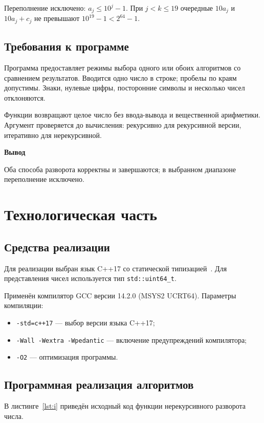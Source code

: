 \documentclass[14pt,a4paper]{extarticle}
\newcommand{\conclusion}[1]{\par\medskip\noindent\begin{minipage}{\linewidth}\setlength{\parindent}{1.25cm}\noindent\hspace*{\parindent}\textbf{Вывод}\par\indent #1\par\end{minipage}\par}
\numberwithin{equation}{section}
\numberwithin{figure}{section}
\numberwithin{table}{section}
\begin{document}
Переполнение исключено: $a_j\le10^j-1$. При $j<k\le19$ очередные $10a_j$ и $10a_j+c_j$ не превышают $10^{19}-1<2^{64}-1$.

\subsection{Требования к программе}
Программа предоставляет режимы выбора одного или обоих алгоритмов со сравнением результатов. Вводится одно число в строке; пробелы по краям допустимы. Знаки, нулевые цифры, посторонние символы и несколько чисел отклоняются.

Функции возвращают целое число без ввода-вывода и вещественной арифметики. Аргумент проверяется до вычисления: рекурсивно для рекурсивной версии, итеративно для нерекурсивной.
\conclusion{Оба способа разворота корректны и завершаются; в выбранном диапазоне переполнение исключено.}

\clearpage\section{Технологическая часть}
\subsection{Средства реализации}
Для реализации выбран язык C++17 со статической типизацией~\cite{stroustrup}. Для представления чисел используется тип \texttt{std::uint64\_t}.

Применён компилятор GCC версии 14.2.0 (MSYS2 UCRT64). Параметры компиляции:
\begin{itemize}\setlength{\itemsep}{0pt}\setlength{\parsep}{0pt}
\item \texttt{-std=c++17} --- выбор версии языка C++17;
\item \texttt{-Wall -Wextra -Wpedantic} --- включение предупреждений компилятора;
\item \texttt{-O2} --- оптимизация программы.
\end{itemize}

\subsection{Программная реализация алгоритмов}
\noindent\begin{minipage}{\linewidth}
\setlength{\parindent}{1.25cm}
В листинге~\ref{lst:i} приведён исходный код функции нерекурсивного разворота числа.


\end{minipage}
\end{document}
